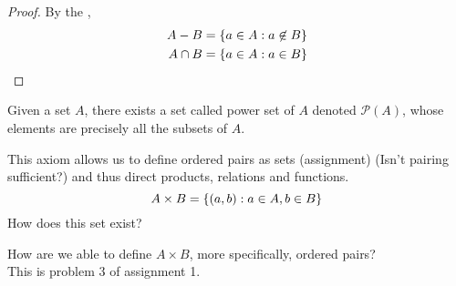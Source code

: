 \begin{proof}
    By the ,
    \begin{align*}
        A - B &= \set{a \in A : a \not\in B} \\
        A \cap B &= \set{a \in A : a \in B}
    \end{align*}
\end{proof}

\begin{axiom} \label{zfc:powers}
    Given a set $A$, there exists a set called power set of $A$ denoted $\mathscr{P}(A)$, whose elements are precisely all the subsets of $A$.   
\end{axiom}
\begin{rem}
    This axiom allows us to define ordered pairs as sets (assignment) (\textcolor{red!85!black}{Isn't pairing sufficient?}) and thus direct products, relations and functions. \[
        A \times B = \set{(a, b) : a \in A, b \in B}
    \] \textcolor{red!85!black}{How does this set exist?}
\end{rem}

\textcolor{red!85!black}{How are we able to define $A \times B$, more specifically, ordered pairs?} \\
\quad \textcolor{green!30!black}{This is problem 3 of assignment 1.} 

